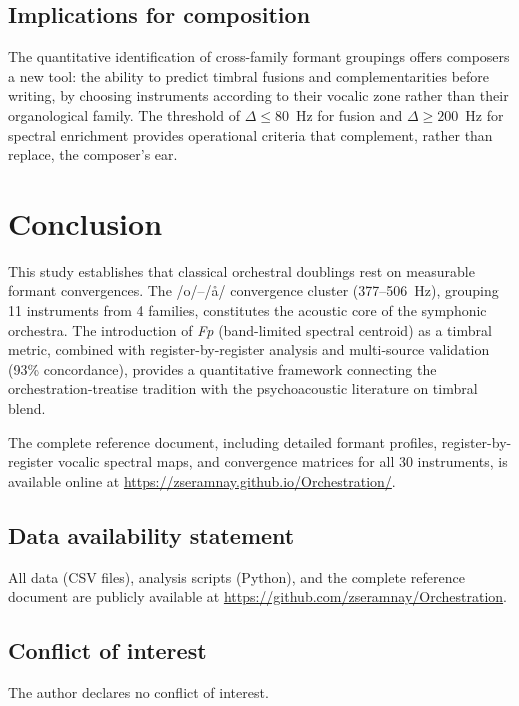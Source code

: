 \documentclass[12pt,a4paper]{article}
\begin{document}
\subsection{Implications for composition}

The quantitative identification of cross-family formant groupings offers
composers a new tool: the ability to predict timbral fusions and
complementarities before writing, by choosing instruments according to their
vocalic zone rather than their organological family. The threshold of
$\Delta \leq 80$~Hz for fusion and $\Delta \geq 200$~Hz for spectral
enrichment provides operational criteria that complement, rather than replace,
the composer's ear.

\section{Conclusion}

This study establishes that classical orchestral doublings rest on measurable
formant convergences. The /o/--/\aa/ convergence cluster (377--506~Hz), grouping
11 instruments from 4 families, constitutes the acoustic core of the symphonic
orchestra. The introduction of \textit{Fp} (band-limited spectral centroid) as a
timbral metric, combined with register-by-register analysis and multi-source
validation (93\% concordance), provides a quantitative framework connecting the
orchestration-treatise tradition with the psychoacoustic literature on timbral
blend.

The complete reference document, including detailed formant profiles, register-by-register
vocalic spectral maps, and convergence matrices for all 30 instruments, is
available online at \url{https://zseramnay.github.io/Orchestration/}.

\subsection*{Data availability statement}
All data (CSV files), analysis scripts (Python), and the complete reference
document are publicly available at
\url{https://github.com/zseramnay/Orchestration}.

\subsection*{Conflict of interest}
The author declares no conflict of interest.
\end{document}
